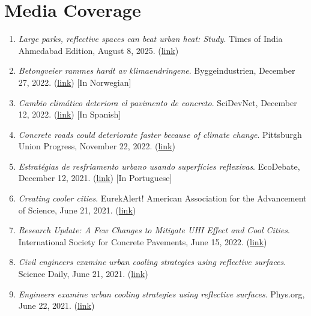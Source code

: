 \documentclass[12pt]{article}
\begin{document}
\bigskip
\section*{Media Coverage}
\hfill
\begin{enumerate}
	\item \textit{Large parks, reflective spaces can beat urban heat: Study}. Times of India Ahmedabad Edition, August 8, 2025. (\href{https://timesofindia.indiatimes.com/city/ahmedabad/large-parks-reflective-spaces-can-beat-urban-heat-study/articleshow/123173409.cms}{link})
	\item \textit{Betongveier rammes hardt av klimaendringene}. Byggeindustrien, December 27, 2022. (\href{https://www.bygg.no/betongveier-rammes-hardt-av-klimaendringene/1514889!/}{link}) [In Norwegian]
	\item \textit{Cambio climático deteriora el pavimento de concreto}. SciDevNet, December 12, 2022. (\href{https://www.scidev.net/america-latina/news/cambio-climatico-deteriora-el-pavimento-de-concreto//}{link}) [In Spanish]
	\item \textit{Concrete roads could deteriorate faster because of climate change}. Pittsburgh Union Progress, November 22, 2022. (\href{https://www.unionprogress.com/2022/11/22/concrete-roads-could-deteriorate-faster-because-of-climate-change/}{link})
	\item \textit{Estratégias de resfriamento urbano usando superfícies reflexivas}. EcoDebate, December 12, 2021. (\href{https://www.ecodebate.com.br/2021/06/21/estrategias-de-resfriamento-urbano-usando-superficies-reflexivas/}{link}) [In Portuguese]
	\item \textit{Creating cooler cities}. EurekAlert! American Association for the Advancement of Science, June 21, 2021. (\href{https://www.eurekalert.org/news-releases/536867}{link})
	\item \textit{Research Update: A Few Changes to Mitigate UHI Effect and Cool Cities}. International Society for Concrete Pavements, June 15, 2022. (\href{https://www.concretepavements.org/2021/06/15/18878/}{link})
	\item \textit{Civil engineers examine urban cooling strategies using reflective surfaces}. Science Daily, June 21, 2021. (\href{https://www.sciencedaily.com/releases/2021/06/210621174101.htm}{link})
	\item \textit{Engineers examine urban cooling strategies using reflective surfaces}. Phys.org, June 22, 2021. (\href{https://phys.org/news/2021-06-urban-cooling-strategies-surfaces.html/}{link})

\end{enumerate}
\end{document}
